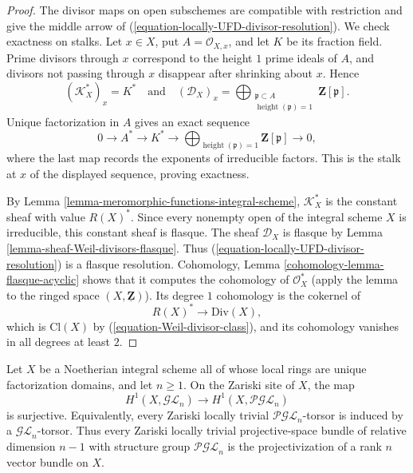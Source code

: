 \begin{proof}
The divisor maps on open subschemes are compatible with restriction and
give the middle arrow of
(\ref{equation-locally-UFD-divisor-resolution}). We check exactness on
stalks. Let $x\in X$, put $A=\mathcal{O}_{X,x}$, and let $K$ be its
fraction field. Prime divisors through $x$ correspond to the height $1$
prime ideals of $A$, and divisors not passing through $x$ disappear after
shrinking about $x$. Hence
$$
(\mathcal{K}_X^*)_x=K^*
\quad\text{and}\quad
(\mathcal{D}_X)_x=
\bigoplus_{\substack{\mathfrak p\subset A\\
\operatorname{height}(\mathfrak p)=1}}\mathbf Z[\mathfrak p].
$$
Unique factorization in $A$ gives an exact sequence
$$
0\longrightarrow A^*\longrightarrow K^*\longrightarrow
\bigoplus_{\operatorname{height}(\mathfrak p)=1}
\mathbf Z[\mathfrak p]\longrightarrow0,
$$
where the last map records the exponents of irreducible factors. This is
the stalk at $x$ of the displayed sequence, proving exactness.

By Lemma \ref{lemma-meromorphic-functions-integral-scheme},
$\mathcal{K}_X^*$ is the constant sheaf with value $R(X)^*$. Since every
nonempty open of the integral scheme $X$ is irreducible, this constant
sheaf is flasque. The sheaf $\mathcal{D}_X$ is flasque by Lemma
\ref{lemma-sheaf-Weil-divisors-flasque}. Thus
(\ref{equation-locally-UFD-divisor-resolution}) is a flasque resolution.
Cohomology, Lemma \ref{cohomology-lemma-flasque-acyclic} shows that it
computes the cohomology of $\mathcal{O}_X^*$ (apply the lemma to the ringed
space $(X, \underline{\mathbf Z})$). Its degree $1$ cohomology is
the cokernel of
$$
R(X)^*\longrightarrow\text{Div}(X),
$$
which is $\text{Cl}(X)$ by
(\ref{equation-Weil-divisor-class}), and its cohomology vanishes in all
degrees at least $2$.
\end{proof}

\begin{lemma}
\label{lemma-locally-UFD-projective-linear-torsors-lift}
\begin{reference}
\cite[Chapter III, \S 3.4, Proposition 3.4.1, p. 161]{Tohoku}
\end{reference}
Let $X$ be a Noetherian integral scheme all of whose local rings are unique
factorization domains, and let $n\geq1$. On the Zariski site of $X$, the map
\[
H^1(X,\mathcal{GL}_n)\longrightarrow H^1(X,\mathcal{PGL}_n)
\]
is surjective. Equivalently, every Zariski locally trivial
$\mathcal{PGL}_n$-torsor is induced by a $\mathcal{GL}_n$-torsor. Thus every
Zariski locally trivial projective-space bundle of relative dimension
$n-1$ with structure group $\mathcal{PGL}_n$ is the projectivization of a
rank $n$ vector bundle on $X$.
\end{lemma}

